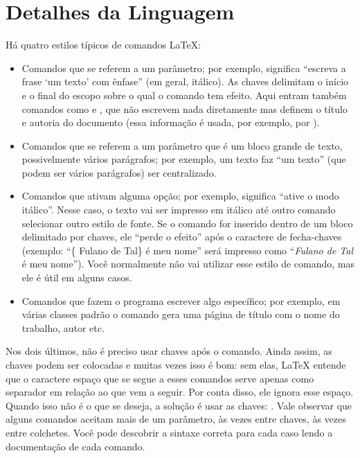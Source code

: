 \section{Detalhes da Linguagem}

Há quatro estilos típicos de comandos \LaTeX{}:

\begin{itemize}
\item Comandos que se referem a um parâmetro; por exemplo,
 significa ``escreva a frase
`um texto' com ênfase'' (em geral, itálico). As chaves delimitam o início
e o final do escopo sobre o qual o comando tem efeito. Aqui entram também
comandos como  e ,
que não escrevem nada diretamente mas definem o título e autoria do documento
(essa informação é usada, por exemplo, por ).

\item Comandos que se referem a um parâmetro que é um bloco grande de
texto, possivelmente vários parágrafos; por exemplo, 
um texto  faz ``um texto'' (que podem ser vários
parágrafos) ser centralizado.

\item Comandos que ativam alguma opção; por exemplo, 
significa ``ative o modo itálico''. Nesse caso, o texto vai ser impresso
em itálico até outro comando selecionar outro estilo de fonte. Se o comando
for inserido dentro de um bloco delimitado por chaves, ele ``perde o
efeito'' após o caractere de fecha-chaves (exemplo: ``\{
Fulano de Tal\} é meu nome'' será impresso como ``\textit{Fulano de Tal} é
meu nome''). Você normalmente não vai utilizar esse estilo de comando, mas
ele é útil em alguns casos.

\item Comandos que fazem o programa escrever algo específico; por exemplo,
em várias classes padrão o comando  gera
uma página de título com o nome do trabalho, autor etc.
\end{itemize}

Nos dois últimos, não é preciso usar chaves após o comando. Ainda assim, as
chaves podem ser colocadas e muitas vezes isso é bom: sem elas, \LaTeX{}
entende que o caractere espaço que se segue a esses comandos serve apenas
como separador em relação ao que vem a seguir. Por conta disso, ele ignora
esse espaço. Quando isso não é o que se deseja, a solução é usar as chaves:
.
Vale observar que alguns comandos aceitam mais de um parâmetro, às vezes
entre chaves, às vezes entre colchetes. Você pode descobrir a sintaxe
correta para cada caso lendo a documentação de cada comando.

